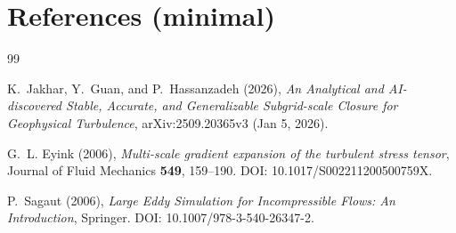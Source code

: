 \documentclass[11pt]{article}
\begin{document}
\section{References (minimal)}
\begin{thebibliography}{99}

K.~Jakhar, Y.~Guan, and P.~Hassanzadeh (2026),
\emph{An Analytical and AI-discovered Stable, Accurate, and Generalizable Subgrid-scale Closure for Geophysical Turbulence},
arXiv:2509.20365v3 (Jan 5, 2026).

G.~L. Eyink (2006),
\emph{Multi-scale gradient expansion of the turbulent stress tensor},
Journal of Fluid Mechanics \textbf{549}, 159--190.
DOI: 10.1017/S002211200500759X.

P.~Sagaut (2006),
\emph{Large Eddy Simulation for Incompressible Flows: An Introduction},
Springer.
DOI: 10.1007/978-3-540-26347-2.

\end{thebibliography}
\end{document}
